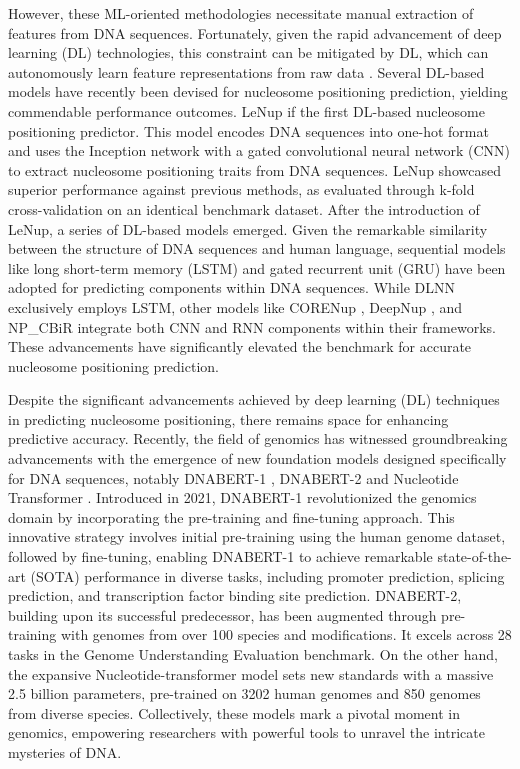 \documentclass[a4paper,fleqn]{cas-dc}
\begin{document}
However, these ML-oriented methodologies necessitate manual extraction of features from DNA sequences. Fortunately, given the rapid advancement of deep learning (DL) technologies, this constraint can be mitigated by DL, which can autonomously learn feature representations from raw data \cite{LeCun2015}. Several DL-based models have recently been devised for nucleosome positioning prediction, yielding commendable performance outcomes. LeNup \cite{Zhang2018} if the first DL-based nucleosome positioning predictor. This model encodes DNA sequences into one-hot format and uses the Inception network with a gated convolutional neural network (CNN) to extract nucleosome positioning traits from DNA sequences. LeNup showcased superior performance against previous methods, as evaluated through k-fold cross-validation on an identical benchmark dataset. After the introduction of LeNup, a series of DL-based models emerged. Given the remarkable similarity between the structure of DNA sequences and human language, sequential models like long short-term memory (LSTM) and gated recurrent unit (GRU) have been adopted for predicting components within DNA sequences. While DLNN \cite{Gangi2018} exclusively employs LSTM, other models like CORENup \cite{Amato2020}, DeepNup \cite{Zhou2022}, and NP\_CBiR \cite{Han2022} integrate both CNN and RNN components within their frameworks. These advancements have significantly elevated the benchmark for accurate nucleosome positioning prediction.

Despite the significant advancements achieved by deep learning (DL) techniques in predicting nucleosome positioning, there remains space for enhancing predictive accuracy. Recently, the field of genomics has witnessed groundbreaking advancements with the emergence of new foundation models designed specifically for DNA sequences, notably DNABERT-1 \cite{Ji2021}, DNABERT-2 \cite{Zhou2023} and Nucleotide Transformer \cite{DallaTorre2023}. Introduced in 2021, DNABERT-1 revolutionized the genomics domain by incorporating the pre-training and fine-tuning approach. This innovative strategy involves initial pre-training using the human genome dataset, followed by fine-tuning, enabling DNABERT-1 to achieve remarkable state-of-the-art (SOTA) performance in diverse tasks, including promoter prediction, splicing prediction, and transcription factor binding site prediction. DNABERT-2, building upon its successful predecessor, has been augmented through pre-training with genomes from over 100 species and modifications. It excels across 28 tasks in the Genome Understanding Evaluation benchmark. On the other hand, the expansive Nucleotide-transformer model sets new standards with a massive 2.5 billion parameters, pre-trained on 3202 human genomes and 850 genomes from diverse species. Collectively, these models mark a pivotal moment in genomics, empowering researchers with powerful tools to unravel the intricate mysteries of DNA.
\end{document}
